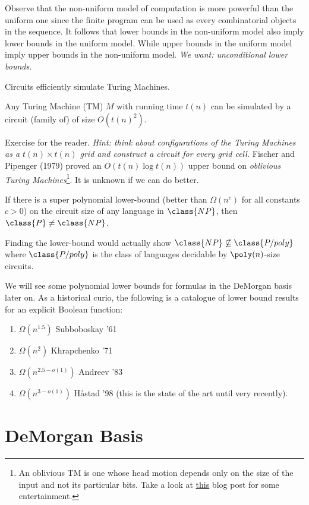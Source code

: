 	Observe that the non-uniform model of computation is more powerful than the uniform one since the finite program can be used as every combinatorial objects in the sequence. It follows that lower bounds in the non-uniform model also imply lower bounds in the uniform model. While upper bounds in the uniform model imply upper bounds in the non-uniform model. \emph{We want: unconditional lower bounds.} 
	
	Circuits efficiently simulate Turing Machines. 
	\begin{lemma}
		Any Turing Machine (TM) $M$ with running time $t(n)$ can be simulated by a circuit (family of) of size $O\left(t(n)^2\right)$.
	\end{lemma}
	Exercise for the reader. \emph{Hint: think about configurations of the Turing Machines as a $t(n) \times t(n)$ grid and construct a circuit for every grid cell.} Fischer and Pipenger (1979) proved an $O(t(n)\log t(n))$ upper bound on \emph{oblivious Turing Machines}\footnote{An oblivious TM is one whose head motion depends only on the size of the input and not its particular bits. Take a look at \href{https://rjlipton.wordpress.com/2009/07/28/oblivious-turing-machines-and-a-crock/}{this} blog post for some entertainment.}. It is unknown if we can do better. 
	
	\begin{corollary}
		If there is a super polynomial lower-bound (better than $\Omega(n^c)$ for all constants $c > 0$) on the circuit size of any language in $\class{NP}$, then $\class{P} \neq \class{NP}$. 
	\end{corollary}
	Finding the lower-bound would actually show $\class{NP} \not\subseteq \class{P/poly}$ where $\class{P/poly}$ is the class of languages decidable by $\poly(n)$-size circuits.
	
	We will see some polynomial lower bounds for formulas in the DeMorgan basis later on. As a historical curio, the following is a catalogue of lower bound results for an explicit Boolean function:
	\begin{enumerate}
		\item $\Omega(n^{1.5})$ Subboboskay '61
		\item $\Omega(n^{2})$ Khrapchenko '71
		\item $\Omega(n^{2.5 - o(1)})$ Andreev '83
		\item $\Omega(n^{3 - o(1)})$ H\aa stad '98 (this is the state of the art until very recently). 
	\end{enumerate}

\section{DeMorgan Basis}
